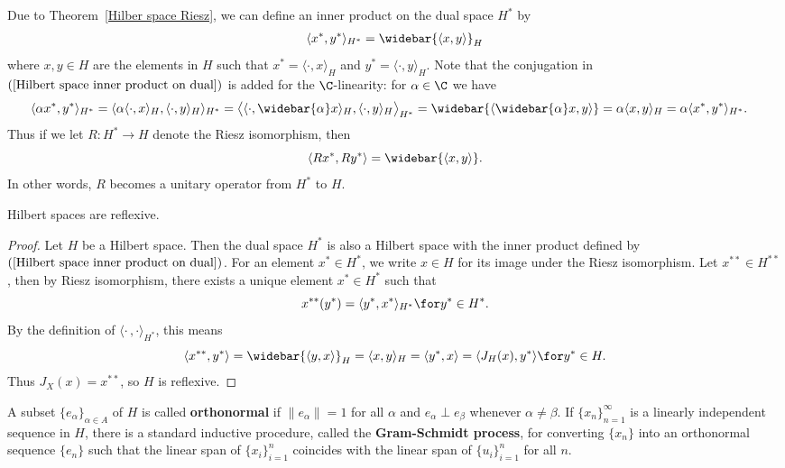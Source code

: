Due to Theorem~\ref{Hilber space Riesz}, we can define an inner product on the dual space $H^*$ by
\begin{align}\label{Hilbert space inner product on dual}
\langle x^*,y^*\rangle_{H^*}=\widebar{\langle x,y\rangle}_H
\end{align}
where $x,y\in H$ are the elements in $H$ such that $x^*=\langle\cdot,x\rangle_H$ and $y^*=\langle\cdot,y\rangle_H$. Note that the conjugation in $(\ref{Hilbert space inner product on dual})$ is added for the $\C$-linearity: for $\alpha\in\C$ we have
\begin{align*}
\langle\alpha x^*,y^*\rangle_{H^*}&=\langle\alpha\langle\cdot,x\rangle_H,\langle\cdot,y\rangle_H\rangle_{H^*}=\big\langle\langle\cdot,\widebar{\alpha}x\rangle_H,\langle\cdot,y\rangle_H\big\rangle_{H^*}=\widebar{\langle\widebar{\alpha}x,y\rangle}=\alpha\langle x,y\rangle_H=\alpha\langle x^*,y^*\rangle_{H^*}.
\end{align*}
Thus if we let $R:H^*\to H$ denote the Riesz isomorphism, then
\[\langle Rx^*,Ry^*\rangle=\widebar{\langle x,y\rangle}.\]
In other words, $R$ becomes a unitary operator from $H^*$ to $H$.
\begin{corollary}\label{Hilbert space is reflexive}
Hilbert spaces are reflexive.
\end{corollary}
\begin{proof}
Let $H$ be a Hilbert space. Then the dual space $H^*$ is also a Hilbert space with the inner product defined by $(\ref{Hilbert space inner product on dual})$. For an element $x^*\in H^*$, we write $x\in H$ for its image under the Riesz isomorphism. Let $x^{**}\in H^{**}$, then by Riesz isomorphism, there exists a unique element $x^*\in H^*$ such that
\[x^{**}(y^*)=\langle y^*,x^*\rangle_{H^*}\for y^*\in H^*.\]
By the definition of $\langle\cdot\,,\cdot\rangle_{H^*}$, this means
\[\langle x^{**},y^*\rangle=\widebar{\langle y,x\rangle}_H=\langle x,y\rangle_H=\langle y^*,x\rangle=\langle J_H(x),y^*\rangle\for y^*\in H.\]
Thus $J_X(x)=x^{**}$, so $H$ is reflexive.
\end{proof}
A subset $\{e_{\alpha}\}_{\alpha\in A}$ of $H$ is called \textbf{orthonormal} if $\|e_{\alpha}\|=1$ for all $\alpha$ and $e_{\alpha}\perp e_\beta$ whenever $\alpha\neq\beta$. If $\{x_n\}_{n=1}^{\infty}$ is a linearly independent sequence in $H$, there is a standard inductive procedure, called the \textbf{Gram-Schmidt process}, for converting $\{x_n\}$ into an orthonormal sequence $\{e_n\}$ such that the linear span of $\{x_i\}_{i=1}^{n}$ coincides with the linear span of $\{u_i\}_{i=1}^{n}$ for all $n$.
